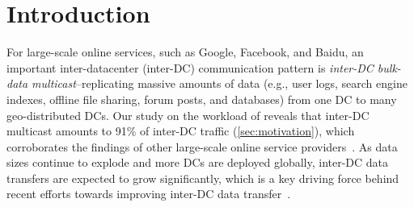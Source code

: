 \section{Introduction}

For large-scale online services, such as Google, Facebook, and
Baidu, an important inter-datacenter (inter-DC) communication pattern is
{\em inter-DC bulk-data multicast}--replicating massive amounts of data
(e.g., user logs, search engine indexes, offline file sharing,
forum posts, and databases)
from one DC to many geo-distributed DCs.
Our study on the workload of
\company reveals that
inter-DC multicast amounts to 91\% of inter-DC traffic
(\Section\ref{sec:motivation}), which corroborates the findings of
other large-scale online service providers~\cite{kumar2015bwe,zhang2016piebridge}.
As data sizes continue to explode and more DCs are deployed
globally, inter-DC data transfers are expected
to grow significantly, which is a key driving force behind
recent efforts towards improving inter-DC data transfer~\cite{savage1999Theend,jain2013b4,kumar2015bwe,hong2013achieving,zhang2015guarantee}.




